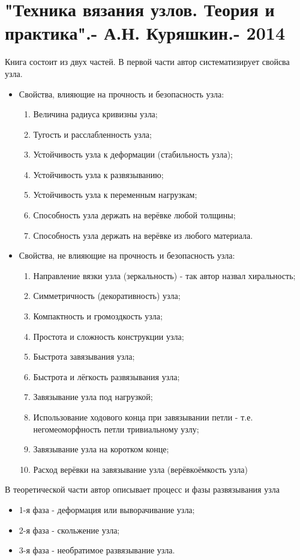 \section{"Техника вязания узлов. Теория и практика".- А.Н. Куряшкин.- 2014}

Книга состоит из двух частей. В первой части автор систематизирует свойсва узла.

\begin{itemize}
\item Свойства, влияющие на прочность и безопасность узла:
\begin{enumerate}
\item Величина радиуса кривизны узла;
\item Тугость и расслабленность узла;
\item Устойчивость узла к деформации (стабильность узла);
\item Устойчивость узла к развязыванию;
\item Устойчивость узла к переменным нагрузкам;
\item Способность узла держать на верёвке любой толщины;
\item Способность узла держать на верёвке из любого материала.
\end{enumerate}
\item Свойства, не влияющие на прочность и безопасность узла:
\begin{enumerate}
\item Направление вязки узла (зеркальность) - так автор назвал хиральность;
\item Симметричность (декоративность) узла;
\item Компактность и громоздкость узла;
\item Простота и сложность конструкции узла;
\item Быстрота завязывания узла;
\item Быстрота и лёгкость развязывания узла;
\item Завязывание узла под нагрузкой;
\item Использование ходового конца при завязывании петли - т.е. негомеоморфность петли тривиальному узлу;
\item Завязывание узла на коротком конце;
\item Расход верёвки на завязывание узла (верёвкоёмкость узла)
\end{enumerate}
\end{itemize}

В теоретической части автор описывает процесс и фазы развязывания узла
\begin{itemize}
\item 1-я фаза - деформация или выворачивание узла;
\item 2-я фаза - скольжение узла;
\item 3-я фаза - необратимое развязывание узла.
\end{itemize}

